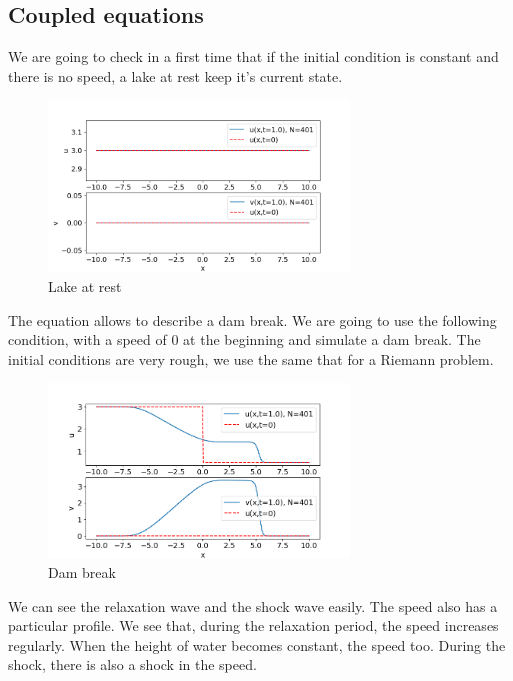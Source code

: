         \newpage
        \subsection{Coupled equations}
            We are going to check in a first time that if the initial condition is constant and there is no speed, a lake at rest keep it's current state.
            \begin{figure}[H]
                \centering
                \includegraphics[width= 8cm]{Coupled/Lcst.png}
                \caption{Lake at rest}
                \label{fig:my_CLcst}
            \end{figure}
            
            
            The equation allows to describe a dam break. We are going to use the following condition, with a speed of 0 at the beginning and simulate a dam break. The initial conditions are very rough, we use the same that for a Riemann problem.
            \begin{figure}[H]
                \centering
                \includegraphics[width= 8cm]{Coupled/Ldam.png}
                \caption{Dam break}
                \label{fig:my_CLdam}
            \end{figure}
        
        
            We can see the relaxation wave and the shock wave easily. The speed also has a particular profile. We see that, during the relaxation period, the speed increases regularly. When the height of water becomes constant, the speed too. During the shock,  there is also a shock in the speed. 
        
